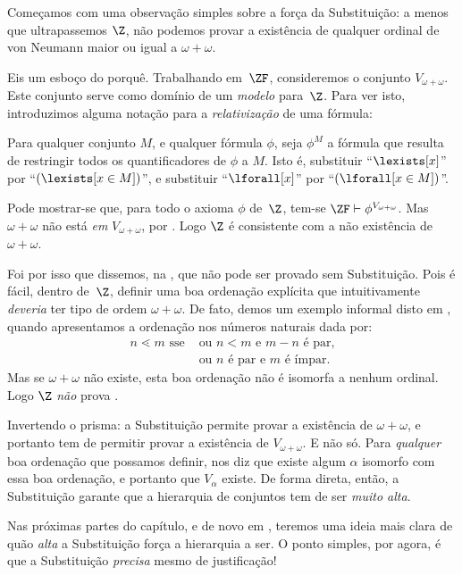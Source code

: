 \documentclass[../../../include/open-logic-section]{subfiles}
\begin{document}

Começamos com uma observação simples sobre a força da Substituição: a menos que ultrapassemos $\Z$, não podemos provar a existência de qualquer ordinal de von Neumann
maior ou igual a $\omega + \omega$. 

Eis um esboço
do porquê. Trabalhando em~$\ZF$, consideremos o conjunto $V_{\omega+\omega}$. Este conjunto serve
como domínio de um \emph{modelo} para~$\Z$. Para ver isto, introduzimos alguma notação para a \emph{relativização} de uma fórmula: 
\begin{defn}
	Para qualquer conjunto $M$, e qualquer fórmula $\phi$, seja $\phi^M$ a fórmula que resulta de restringir todos os quantificadores de $\phi$ a $M$. Isto é, substituir ``$\lexists[x]$'' por ``$(\lexists[x \in M])$'', e
	substituir ``$\lforall[x]$'' por ``$(\lforall[x \in M])$''. 
\end{defn}\noindent
Pode mostrar-se que, para todo o axioma $\phi$ de~$\Z$, tem-se $\ZF \vdash
\phi^{V_{\omega+\omega}}$. Mas $\omega+\omega$ não está \emph{em}
$V_{\omega+\omega}$, por  . Logo $\Z$ é
consistente com a não existência de $\omega+\omega$.

Foi por isso que dissemos, na , que
 não pode ser provado
sem Substituição. Pois é fácil, dentro de~$\Z$, definir uma
boa ordenação explícita que intuitivamente \emph{deveria} ter tipo de ordem
$\omega+\omega$. De fato, demos um exemplo informal disto em
, quando apresentamos a ordenação nos
números naturais dada por:
\begin{align*}
	n \lessdot m \text{ sse }&\text{ou }n < m\text{ e }m-n\text{ é par,}\\
	& \text{ou $n$ é par e $m$ é ímpar.}
\end{align*}
Mas se $\omega+\omega$ não existe, esta boa ordenação não é
isomorfa a nenhum ordinal. Logo $\Z$ \emph{não} prova
. 

Invertendo o prisma: a Substituição permite provar a existência
de $\omega+\omega$, e portanto tem de permitir provar a existência de
$V_{\omega+\omega}$. E não só. Para \emph{qualquer} boa ordenação
que possamos definir, 
nos diz que existe algum $\alpha$ isomorfo com essa
boa ordenação, e portanto que $V_\alpha$ existe. De forma direta,
então, a Substituição garante que a hierarquia de conjuntos tem de ser
\emph{muito alta}. 

Nas próximas partes do capítulo, e de novo em
, teremos uma ideia mais clara de quão
\emph{alta} a Substituição força a hierarquia a ser. O
ponto simples, por agora, é que a Substituição \emph{precisa} mesmo de
justificação!
\end{document}
